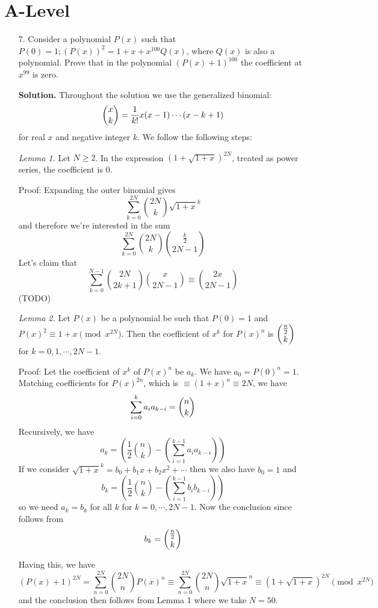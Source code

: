\documentclass[11pt,a4paper]{article}
\begin{document}
\section*{A-Level}
\begin{enumerate}
	\item[7.] 
	Consider a polynomial $P(x)$ such that
	$P(0) = 1; (P(x))^2 = 1 + x + x^{100}Q(x)$, 
	where $Q(x)$ is also a polynomial.
	Prove that in the polynomial $(P(x) + 1)^{100}$ the coefficient at $x^{99}$ is zero.
	
	\textbf{Solution.} 
	Throughout the solution we use the generalized binomial: 
	\[
	\dbinom{x}{k} = \frac{1}{k!} x(x-1)\cdots (x-k+1)
	\]
	for real $x$ and negative integer $k$. 
	We follow the following steps: 
	
	\emph{Lemma 1.} 
	Let $N\ge 2$. 
	In the expression $(1+\sqrt{1+x})^{2N}$, treated as power series, 
	the coefficient is 0. 
	
	Proof: Expanding the outer binomial gives 
	\[
	\sum_{k=0}^{2N}\binom{2N}{k}\sqrt{1+x}^k
	\]
	and therefore we're interested in the sum 
	\[
	\sum_{k=0}^{2N}\binom{2N}{k}\binom{\frac k2}{2N-1}
	\]
	Let's claim that 
	\[
	\sum_{k=0}^{N-1}\binom{2N}{2k+1}\binom{x}{2N-1}
	\equiv \binom{2x}{2N-1}
	\]
	(TODO)
	
	\emph{Lemma 2.} 
	Let $P(x)$ be a polynomial be such that $P(0)=1$ and $P(x)^2 \equiv 1+x\pmod{x^{2N}}$. 
	Then the coefficient of $x^k$ for $P(x)^{n}$ is $\dbinom{\frac n2}{k}$ for $k=0, 1, \cdots, 2N-1$. 
	
	Proof: Let the coefficient of $x^k$ of $P(x)^{n}$ be $a_k$. We have $a_0=P(0)^n=1$. 
	Matching coefficients for $P(x)^{2n}$, which is $\equiv (1+x)^n\equiv{2N}$, we have 
	\[
	\sum_{i=0}^k a_{i}a_{k-i} = 
	\dbinom{n}{k}
	\]
	Recursively, we have 
	\[
	a_k = \left(\frac 12\binom{n}{k}-\left(\sum_{i=1}^{k-1}a_ia_{k-i}\right)\right)
	\]
	If we consider $\sqrt{1+x}^{k}=b_0+b_1x+b_2x^2+\cdots$ then we also have $b_0=1$ and 
	\[
	b_k = \left(\frac 12\binom{n}{k}-\left(\sum_{i=1}^{k-1}b_ib_{k-i}\right)\right)
	\]
	so we need $a_k=b_k$ for all $k$ for $k=0, \cdots, 2N-1$. 
	Now the conclusion since follows from 
	\[
	b_k=\dbinom{\frac n2}{k}
	\]
	
	Having this, we have 
	\[
	(P(x)+1)^{2N}
	=\sum_{n=0}^{2N}\binom{2N}{n}P(x)^n
	\equiv \sum_{n=0}^{2N}\binom{2N}{n}\sqrt{1+x}^n
	\equiv(1+\sqrt{1+x})^{2N}
	\pmod{x^{2N}}
	\]
	and the conclusion then follows from Lemma 1 where we take $N=50$. 
	
\end{enumerate}
\end{document}
